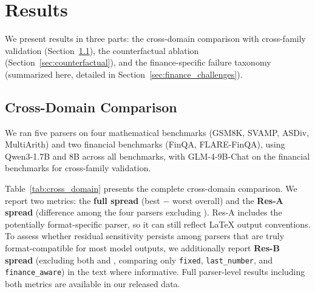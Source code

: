 \section{Results}
\label{sec:results}

We present results in three parts: the cross-domain comparison with cross-family validation (Section~\ref{sec:cross_domain}), the counterfactual ablation (Section~\ref{sec:counterfactual}), and the finance-specific failure taxonomy (summarized here, detailed in Section~\ref{sec:finance_challenges}).

\subsection{Cross-Domain Comparison}
\label{sec:cross_domain}

We ran five parsers on four mathematical benchmarks (GSM8K, SVAMP, ASDiv, MultiArith) and two financial benchmarks (FinQA, FLARE-FinQA), using Qwen3-1.7B and 8B across all benchmarks, with GLM-4-9B-Chat on the financial benchmarks for cross-family validation.

Table~\ref{tab:cross_domain} presents the complete cross-domain comparison. We report two metrics: the \textbf{full spread} (best $-$ worst overall) and the \textbf{Res-A spread} (difference among the four parsers excluding \numparser{}). Res-A includes the potentially format-specific \boxedparser{} parser, so it can still reflect \LaTeX{} output conventions. To assess whether residual sensitivity persists among parsers that are truly format-compatible for most model outputs, we additionally report \textbf{Res-B spread} (excluding both \numparser{} and \boxedparser{}, comparing only \texttt{fixed}, \texttt{last\_number}, and \texttt{finance\_aware}) in the text where informative. Full parser-level results including both metrics are available in our released data.

